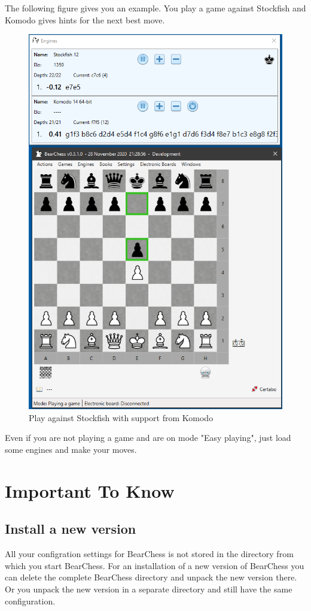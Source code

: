 \documentclass[11pt,a4paper]{article}
\begin{document}
The following figure gives you an example. You play a game against Stockfish and Komodo gives hints for the next best move. 

\begin{figure}[H]
	\centering
	\includegraphics[scale=0.7]{Extended1.png}
	\caption{Play against Stockfish with support from Komodo}
	\label{fig:Extended1}
\end{figure}

Even if you are not playing a game and are on mode "Easy playing", just load some engines and make your moves.

\section{Important To Know}

\subsection{Install a new version}
All your configration settings for BearChess is not stored in the directory from which you start BearChess. For an installation of a new version of BearChess you can delete the complete BearChess directory and unpack the new version there. Or you unpack the new version in a separate directory and still have the same configuration.
\end{document}
